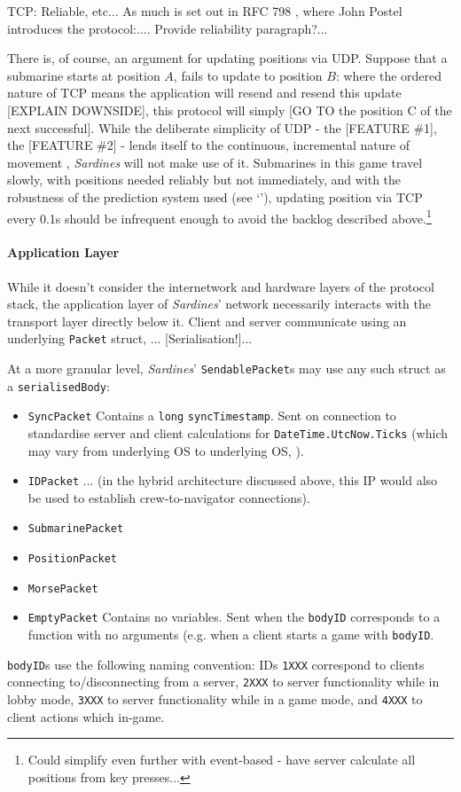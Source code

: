 \documentclass[a4paper, 10pt]{article}
\begin{document}
\begin{flushleft}
TCP: Reliable, etc...
As much is set out in RFC 798 %
, where John Postel introduces the protocol:.... %
Provide reliability paragraph?...

\vspace{5pt}\noindent
There is, of course, an argument for updating positions via UDP. Suppose that a submarine starts at position $A$, fails to update to position $B$: where the ordered nature of TCP means the application will resend and resend this update [EXPLAIN DOWNSIDE], this protocol will simply [GO TO the position C of the next successful].  While the deliberate simplicity of UDP - the [FEATURE \#1], the [FEATURE \#2] - lends itself to the continuous, incremental nature of movement , \textit{Sardines} will not make use of it. Submarines in this game travel slowly, with positions needed reliably but not immediately, and with the robustness of the prediction system used (see `'), updating position via TCP every 0.1s should be infrequent enough to avoid the backlog described above.\footnote{Could simplify even further with event-based - have server calculate all positions from key presses...}

\paragraph{Application Layer} 

While it doesn't consider the internetwork and hardware layers of the protocol stack, the application layer of \textit{Sardines}' network necessarily interacts with the transport layer directly below it. Client and server communicate using an underlying \texttt{Packet} struct, ...
[Serialisation!]...

\vspace{5pt}\noindent
At a more granular level, \textit{Sardines}' \texttt{SendablePacket}s may use any such struct as a \texttt{serialisedBody}:
\begin{itemize}[noitemsep]
\item \texttt{SyncPacket} Contains a \texttt{long} \texttt{syncTimestamp}. Sent on connection to standardise server and client calculations for \texttt{DateTime.UtcNow.Ticks} (which may vary from underlying OS to underlying OS, \citealp{msftUTC}).
\item \texttt{IDPacket} ... (in the hybrid architecture discussed above, this IP would also be used to establish crew-to-navigator connections).
\item \texttt{SubmarinePacket} 
\item \texttt{PositionPacket}
\item \texttt{MorsePacket}
\item \texttt{EmptyPacket} Contains no variables. Sent when the \texttt{bodyID} corresponds to a function with no arguments (e.g. when a client starts a game with \texttt{bodyID}.
\end{itemize}
\texttt{bodyID}s use the following naming convention: IDs \texttt{1XXX} correspond to clients connecting to/disconnecting from a server, \texttt{2XXX} to server functionality while in lobby mode, \texttt{3XXX} to server functionality while in a game mode, and \texttt{4XXX} to client actions which in-game.


\end{flushleft}
\end{document}

